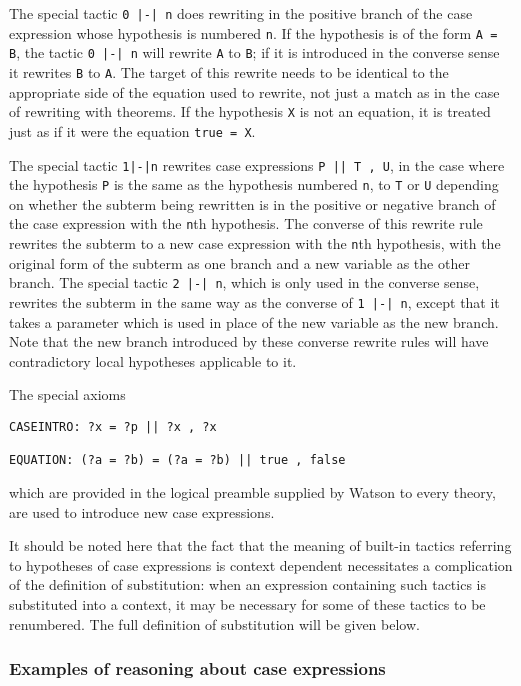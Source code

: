 \documentclass{kluwer}
\begin{document}
\begin{article}
The special tactic {\tt 0 |-| n} does rewriting in the positive branch
of the case expression whose hypothesis is numbered {\tt n}.  If the
hypothesis is of the form {\tt A = B}, the tactic {\tt 0 |-| n} will
rewrite {\tt A} to {\tt B}; if it is introduced in the converse sense
it rewrites {\tt B} to {\tt A}.  The target of this rewrite needs to
be identical to the appropriate side of the equation used to rewrite,
not just a match as in the case of rewriting with theorems.  If the
hypothesis {\tt X} is not an equation, it is treated just as if it
were the equation {\tt true = X}.

The special tactic {\tt 1|-|n} rewrites case expressions {\tt P || T ,
U}, in the case where the hypothesis {\tt P} is the same as the hypothesis
numbered {\tt n}, to {\tt T} or {\tt U} depending on whether the
subterm being rewritten is in the positive or negative branch of the
case expression with the {\tt n}th hypothesis.  The converse of this
rewrite rule rewrites the subterm to a new case expression with the
{\tt n}th hypothesis, with the original form of the subterm as one
branch and a new variable as the other branch.  The special tactic
{\tt 2 |-| n}, which is only used in the converse sense, rewrites the
subterm in the same way as the converse of {\tt 1 |-| n}, except that it
takes a parameter which is used in place of the new variable as the
new branch.  Note that the new branch introduced by these converse
rewrite rules will have contradictory local hypotheses applicable to
it.

The special axioms 
\begin{verbatim}
CASEINTRO: ?x = ?p || ?x , ?x

EQUATION: (?a = ?b) = (?a = ?b) || true , false
\end{verbatim}
\noindent which are provided
in the logical preamble supplied by Watson to every theory, are used
to introduce new case expressions.

It should be noted here that the fact that the meaning of built-in
tactics referring to hypotheses of case expressions is context
dependent necessitates a complication of the definition of
substitution: when an expression containing such tactics is
substituted into a context, it may be necessary for some of these
tactics to be renumbered.  The full definition of substitution will be
given below.

\subsubsection{Examples of reasoning about case expressions}


\end{article}
\end{document}
